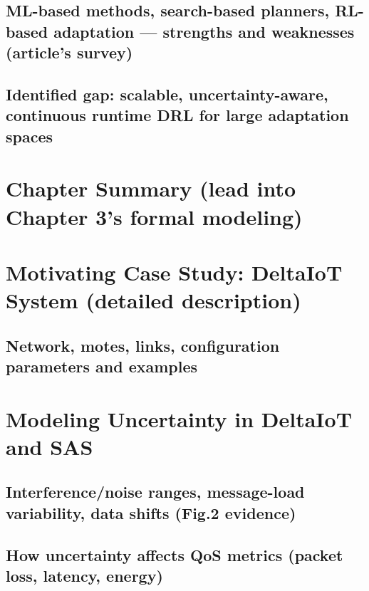 \documentclass[11pt,a4paper]{article}
\begin{document}
\subsection{ML-based methods, search-based planners, RL-based adaptation --- strengths and weaknesses (article's survey)}
\subsection{Identified gap: scalable, uncertainty-aware, continuous runtime DRL for large adaptation spaces}

\section{Chapter Summary (lead into Chapter 3's formal modeling)}

\newpage


\setcounter{section}{0}
\renewcommand{\thesection}{3.\arabic{section}}
\renewcommand{\thesubsection}{3.\arabic{section}.\arabic{subsection}}
\renewcommand{\thesubsubsection}{3.\arabic{section}.\arabic{subsection}.\arabic{subsubsection}}

\section{Motivating Case Study: DeltaIoT System (detailed description)}
\subsection{Network, motes, links, configuration parameters and examples}

\section{Modeling Uncertainty in DeltaIoT and SAS}
\subsection{Interference/noise ranges, message-load variability, data shifts (Fig.2 evidence)}
\subsection{How uncertainty affects QoS metrics (packet loss, latency, energy)}
\end{document}
